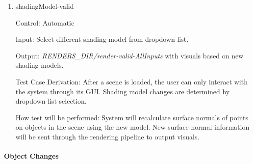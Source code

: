 \documentclass[12pt, titlepage]{article}
\begin{document}
\begin{enumerate}
	
	\item{shadingModel-valid\\}
	
	Control: Automatic
	
	Input: Select different shading model from dropdown list.
	
	Output: \textit{RENDERS\_DIR/render-valid-AllInputs} with visuals based on 
	new shading models.
	
	Test Case Derivation: After a scene is loaded, the user can only interact 
	with the system through its GUI. Shading model changes are determined by 
	dropdown list selection.
	
	How test will be performed: System will recalculate surface normals of 
	points on objects in the scene using the new model. New surface normal
	information will be sent through the rendering pipeline to output visuals.
	
\end{enumerate}

\paragraph{Object Changes}
\end{document}
